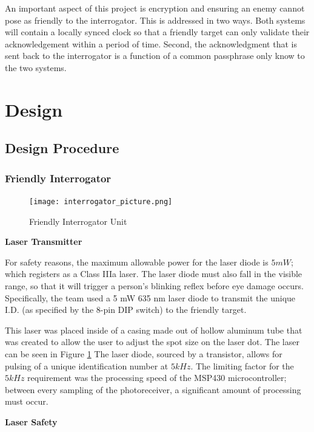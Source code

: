 \documentclass[letterpaper,10pt]{article}
\begin{document}
\begin{spacing}{1.15}
An important aspect of this project is encryption and ensuring an enemy cannot pose as friendly to the interrogator. This is addressed in two ways. Both systems will contain a locally synced clock so that a friendly target can only validate their acknowledgement within a period of time. Second, the acknowledgment that is sent back to the interrogator is a function of a common passphrase only know to the two systems.


\section{Design}

\subsection{Design Procedure} 

\subsubsection{Friendly Interrogator}
\begin{figure} [H]
	\centering
	\texttt{[image: interrogator\_picture.png]}
	\caption{Friendly Interrogator Unit\label{fig:interrogator-picture}}
\end{figure}

\hspace{5mm}\textbf{Laser Transmitter} \label{section:laser-transmitter-design-procedure}

For safety reasons, the maximum allowable power for the laser diode is $5mW$; which registers as a Class IIIa laser. The laser diode must also fall in the visible range, so that it will trigger a person's blinking reflex before eye damage occurs. Specifically, the team used a 5 mW 635 nm laser diode to transmit the unique I.D. (as specified by the 8-pin DIP switch) to the friendly target. 

This laser was placed inside of a casing made out of hollow aluminum tube that was created to allow the user to adjust the spot size on the laser dot. The laser can be seen in Figure \ref{fig:interrogator-picture} The laser diode, sourced by a transistor, allows for pulsing of a unique identification number at $5kHz$. The limiting factor for the $5kHz$ requirement was the processing speed of the MSP430 microcontroller; between every sampling of the photoreceiver, a significant amount of processing must occur. 

\hspace{5mm}\textbf{Laser Safety}


\end{spacing}
\end{document}
